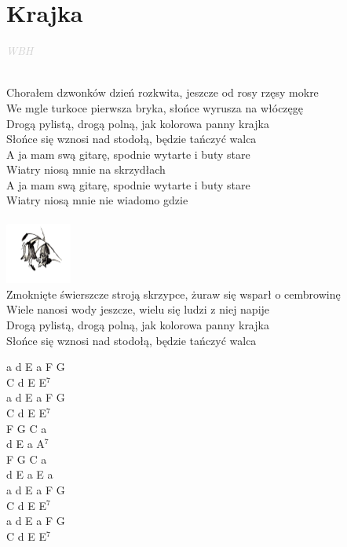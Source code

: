 \documentclass[a5paper, 10pt]{book}
\begin{document}
\section{Krajka}\textcolor{lightgray}{\textit{WBH}}\\~\\
\begin{minipage}[t]{0.87\textwidth}
Chorałem dzwonków dzień rozkwita, jeszcze od rosy rzęsy mokre \\
We mgle turkoce pierwsza bryka, słońce wyrusza na włóczęgę\\
Drogą pylistą, drogą polną, jak kolorowa panny krajka\\
Słońce się wznosi nad stodołą, będzie tańczyć walca\\

\hspace*{5mm}A ja mam swą gitarę, spodnie wytarte i buty stare\\
\hspace*{5mm}Wiatry niosą mnie na skrzydłach\\
\hspace*{5mm}A ja mam swą gitarę, spodnie wytarte i buty stare\\
\hspace*{5mm}Wiatry niosą mnie nie wiadomo gdzie\\
\vspace*{5mm}\\
\includegraphics[height=2cm, right]{images/krajka.png}\vspace*{-2.55cm}\\
Zmoknięte świerszcze stroją skrzypce, żuraw się wsparł o cembrowinę\\
Wiele nanosi wody jeszcze, wielu się ludzi z niej napije\\
Drogą pylistą, drogą polną, jak kolorowa panny krajka\\
Słońce się wznosi nad stodołą, będzie tańczyć walca\\
\end{minipage}
\begin{minipage}[t]{0.13\textwidth}
a d E a F G\\
C d E E$^7$\\
a d E a F G\\
C d E E$^7$\\

F G C a\\
d E a A$^7$\\
F G C a\\
d E a E a\\

a d E a F G\\
C d E E$^7$\\
a d E a F G\\
C d E E$^7$\\
\end{minipage}
\end{document}
